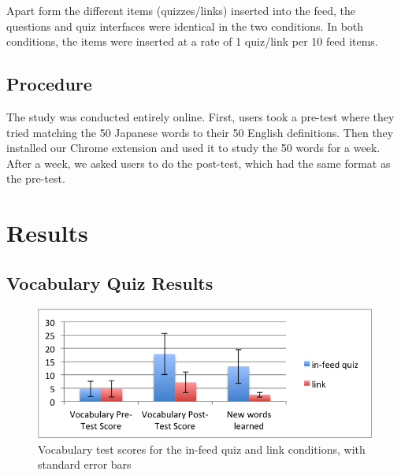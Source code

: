 \documentclass{sigchi}
\begin{document}
Apart form the different items (quizzes/links) inserted into the feed, the questions and quiz interfaces were identical in the two conditions. In both conditions, the items were inserted at a rate of 1 quiz/link per 10 feed items. %


\subsection{Procedure}

The study was conducted entirely online. First, users took a pre-test where they tried matching the 50 Japanese words to their 50 English definitions. Then they installed our Chrome extension and used it to study the 50 words for a week. After a week, we asked users to do the post-test, which had the same format as the pre-test.


\section{Results}

\subsection{Vocabulary Quiz Results}

\begin{figure}
\centering
\includegraphics[width=1.0\columnwidth]{vocab-test-scores}
\caption{Vocabulary test scores for the in-feed quiz and link conditions, with standard error bars}
\label{fig:vocab-test-scores}
\end{figure}
\end{document}

